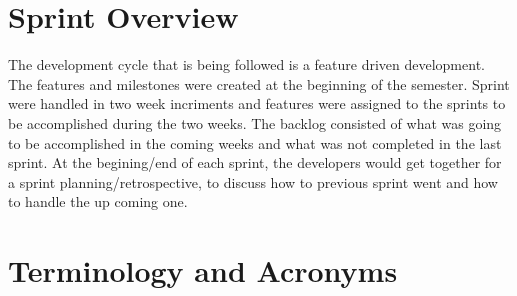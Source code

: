 \section{Sprint  Overview}
The development cycle that is being followed is a feature driven development.
The features and milestones were created at the beginning of the semester.
Sprint were handled in two week incriments and features were assigned to 
the sprints to be accomplished during the two weeks. The backlog consisted
of what was going to be accomplished in the coming weeks and what was not
completed in the last sprint. At the begining/end of each sprint, the 
developers would get together for a sprint planning/retrospective, to discuss
how to previous sprint went and how to handle the up coming one.


\section{Terminology and Acronyms}

